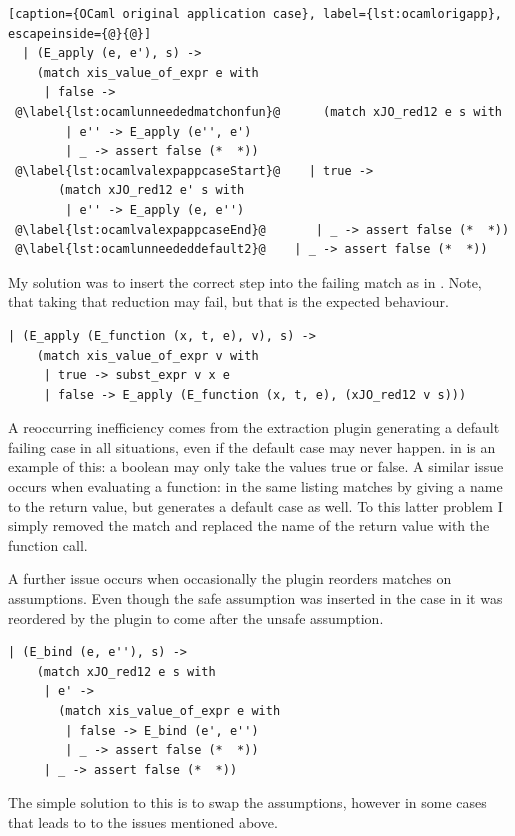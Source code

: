 \documentclass[12pt,twoside,notitlepage]{report}
\begin{document}
\begin{minipage}{\linewidth}

\begin{lstlisting}[caption={OCaml original application case}, label={lst:ocamlorigapp}, escapeinside={@}{@}]
  | (E_apply (e, e'), s) ->
    (match xis_value_of_expr e with
     | false ->
 @\label{lst:ocamlunneededmatchonfun}@      (match xJO_red12 e s with
        | e'' -> E_apply (e'', e')
        | _ -> assert false (*  *))
 @\label{lst:ocamlvalexpappcaseStart}@    | true ->
       (match xJO_red12 e' s with
        | e'' -> E_apply (e, e'')
 @\label{lst:ocamlvalexpappcaseEnd}@       | _ -> assert false (*  *))
 @\label{lst:ocamlunneededdefault2}@    | _ -> assert false (*  *))
\end{lstlisting}

\end{minipage}
My solution was to insert the correct step into the failing match as in . Note, that taking that reduction may fail, but that is the expected behaviour.


\vspace{3mm}
\begin{minipage}{\linewidth}

\begin{lstlisting}[caption={OCaml fixed substitution case}, label={lst:ocamlfixsub}]
  | (E_apply (E_function (x, t, e), v), s) ->
    (match xis_value_of_expr v with
     | true -> subst_expr v x e
     | false -> E_apply (E_function (x, t, e), (xJO_red12 v s)))
\end{lstlisting}

\end{minipage}
A reoccurring inefficiency comes from the extraction plugin generating a default failing case in all situations, even if the default case may never happen.  in  is an example of this: a boolean may only take the values true or false. A similar issue occurs when evaluating a function:   in the same listing matches by giving a name to the return value, but generates a default case as well. To this latter problem I simply removed the match and replaced the name of the return value with the function call.

A further issue occurs when occasionally the plugin reorders matches on assumptions. Even though the safe assumption was inserted in the case in  it was reordered by the plugin to come after the unsafe assumption. 
\begin{minipage}{\linewidth}

\begin{lstlisting}[caption={OCaml swapped assumptions}, label={lst:ocamlswapassume}]
  | (E_bind (e, e''), s) ->
    (match xJO_red12 e s with
     | e' ->
       (match xis_value_of_expr e with
        | false -> E_bind (e', e'')
        | _ -> assert false (*  *))
     | _ -> assert false (*  *))
\end{lstlisting}

\end{minipage}
The simple solution to this is to swap the assumptions, however in some cases that leads to to the issues mentioned above.
\end{document}
